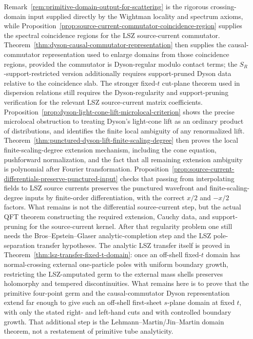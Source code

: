 Remark~\ref{rem:primitive-domain-output-for-scattering} is the rigorous
crossing-domain input supplied directly by the Wightman locality and spectrum
axioms, while
Proposition~\ref{prop:source-current-commutator-coincidence-region} supplies
the spectral coincidence regions for the LSZ source-current commutator.
Theorem~\ref{thm:dyson-causal-commutator-representation} then supplies the
causal-commutator representation used to enlarge domains from those
coincidence regions, provided the commutator is Dyson-regular modulo contact
terms; the \(S_R\)-support-restricted version additionally requires
support-pruned Dyson data relative to the coincidence slab.  The stronger
fixed-\(t\) cut-plane theorem used in dispersion relations still requires the
Dyson-regularity and support-pruning verification for the relevant LSZ
source-current matrix coefficients.
Proposition~\ref{prop:dyson-light-cone-lift-microlocal-criterion} shows the
precise microlocal obstruction to treating Dyson's light-cone lift as an
ordinary product of distributions, and identifies the finite local ambiguity
of any renormalized lift.
Theorem~\ref{thm:punctured-dyson-lift-finite-scaling-degree} then proves the
local finite-scaling-degree extension mechanism, including the cone equation,
pushforward normalization, and the fact that all remaining extension
ambiguity is polynomial after Fourier transformation.
Proposition~\ref{prop:source-current-differentials-preserve-punctured-input}
checks that passing from interpolating fields to LSZ source currents preserves
the punctured wavefront and finite-scaling-degree inputs by finite-order
differentiation, with the correct \(x/2\) and \(-x/2\) factors.  What remains
is not the differential source-current step, but the actual QFT theorem
constructing the required extension, Cauchy data, and support-pruning for the
source-current kernel.  After that regularity problem one still needs the
Bros--Epstein--Glaser analytic-completion step and the LSZ
pole-separation transfer hypotheses.  The analytic LSZ transfer itself is
proved in
Theorem~\ref{thm:lsz-transfer-fixed-t-domain}: once an off-shell fixed-\(t\)
domain has normal-crossing external one-particle poles with uniform boundary
growth, restricting the LSZ-amputated germ to the external mass shells
preserves holomorphy and tempered discontinuities.  What remains here is to
prove that the primitive four-point germ and the causal-commutator Dyson
representation extend far enough to give such an off-shell first-sheet
\(s\)-plane domain at fixed \(t\), with only the stated right- and left-hand
cuts and with controlled boundary growth.  That additional step is the
Lehmann--Martin/Jin--Martin domain theorem, not a restatement of primitive
tube analyticity.

